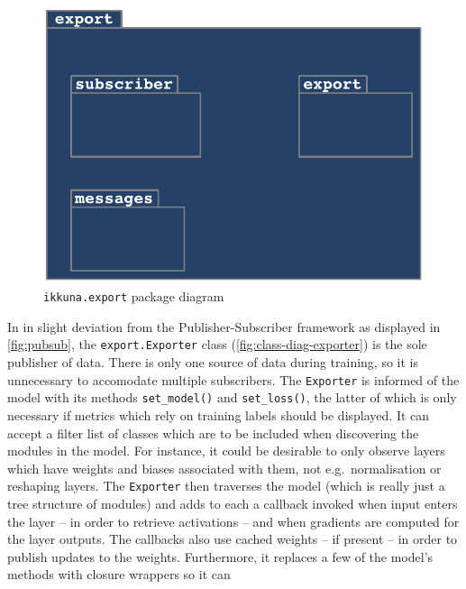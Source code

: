 \begin{figure}
    \hypertarget{fig:pack-diag-export}{%
        \centering
        \includegraphics[max width=.5\textwidth]{gfx/diagrams/class_diagrams/export_package_diagram.pdf}
        \caption{\texttt{ikkuna.export} package diagram}\label{fig:pack-diag-export}
    }
\end{figure}

In in slight deviation from the Publisher-Subscriber framework as displayed in
\cref{fig:pubsub}, the \texttt{export.Exporter} class
(\cref{fig:class-diag-exporter}) is the sole publisher of data. There is only one
source of data during training, so it is unnecessary to accomodate multiple
subscribers. The \texttt{Exporter} is informed of the model with its methods
\lstinline{set_model()} and \lstinline{set_loss()}, the latter of which is only
necessary if metrics which rely on training labels should be displayed.  It can
accept a filter list of classes which are to be included when discovering the
modules in the model. For instance, it could be desirable to only observe layers
which have weights and biases associated with them, not e.g.~normalisation or
reshaping layers. The \texttt{Exporter} then traverses the model (which is
really just a tree structure of modules) and adds to each a callback invoked
when input enters the layer -- in order to retrieve activations -- and when
gradients are computed for the layer outputs. The callbacks also use cached
weights -- if present -- in order to publish updates to the weights.
Furthermore, it replaces a few of the model's methods with closure wrappers so
it can

